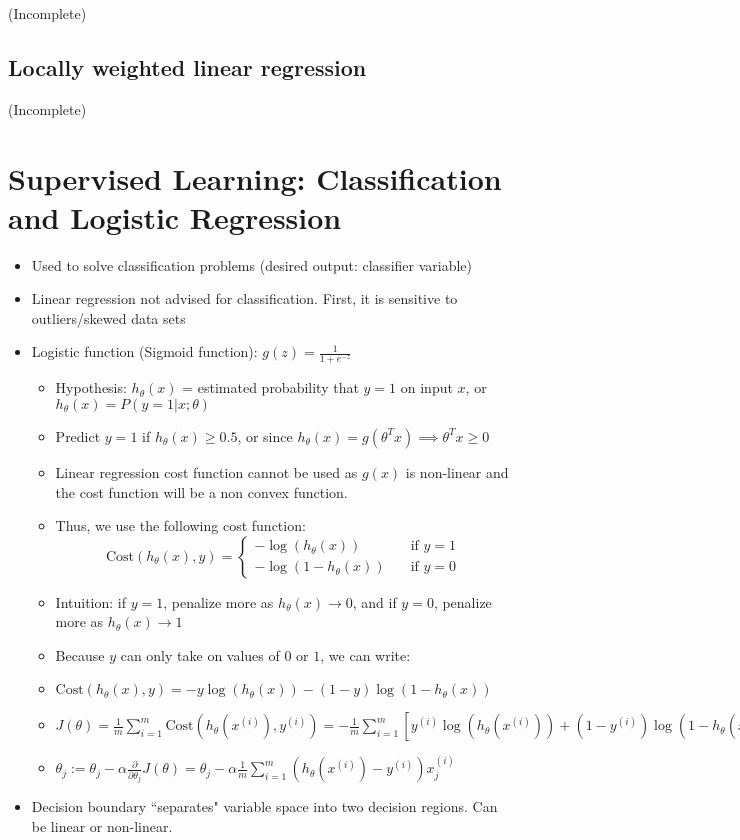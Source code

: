 \documentclass[letterpaper,10pt]{article}
\begin{document}
(Incomplete)

\subsection{Locally weighted linear regression}

(Incomplete)
	

\section{Supervised Learning: Classification and Logistic Regression}
\begin{itemize}
\item Used to solve classification problems (desired output: classifier variable)
\item Linear regression not advised for classification. First, it is sensitive to outliers/skewed data sets
\item Logistic function (Sigmoid function): $g(z) = \frac{1}{1+e^{-z}}$
	
	\begin{itemize}
	\item Hypothesis: $h_{\theta}(x)$ = estimated probability that $y=1$ on input $x$, or $h_{\theta}(x) = P(y=1|x;\theta)$
	\item Predict $y=1$ if $h_{\theta}(x) \geq 0.5$, or since $h_{\theta}(x) = g(\theta^T x) \implies \theta^Tx \geq 0$
	\item Linear regression cost function cannot be used as $g(x)$ is non-linear and the cost function will be a non convex function.
	\item Thus, we use the following cost function:
	$$
	\text{Cost}\left( h_{\theta}(x),y \right) = \left\{
     	\begin{array}{lr}
       	-\log\left(h_{\theta}(x) \right) & \quad \text{if  } y=1\\
       	-\log\left( 1 - h_{\theta}(x) \right) & \quad \text{if  } y=0
     	\end{array}
   	\right.
	$$
	\item Intuition: if $y=1$, penalize more as $h_{\theta}(x) \rightarrow 0$, and if $y=0$, penalize more as $h_{\theta}(x) \rightarrow 1$
	\item Because $y$ can only take on values of $0$ or $1$, we can write:
	\item $\text{Cost}\left( h_{\theta}(x),y \right) = -y\log\left(h_{\theta}(x) \right) - (1-y)\log\left(1 - h_{\theta}(x) \right) $
	\item $J(\theta) = \frac{1}{m} \sum_{i=1}^m \text{Cost}\left( h_{\theta}(x^{(i)}),y^{(i)} \right) = -  \frac{1}{m} \sum_{i=1}^m \left[ y^{(i)}\log\left(h_{\theta}(x^{(i)}) \right) + (1-y^{(i)})\log\left(1 - h_{\theta}(x^{(i)}) \right) \right]$
	\item $\theta_j := \theta_j - \alpha \frac{\partial}{\partial \theta_j} J(\theta) = \theta_j - \alpha \frac{1}{m} \sum_{i=1}^m \left( h_{\theta}(x^{(i)}) - y^{(i)}  \right) x_j^{(i)}$
	\end{itemize}
\item Decision boundary ``separates" variable space into two decision regions. Can be linear or non-linear.


\end{itemize}
\end{document}
